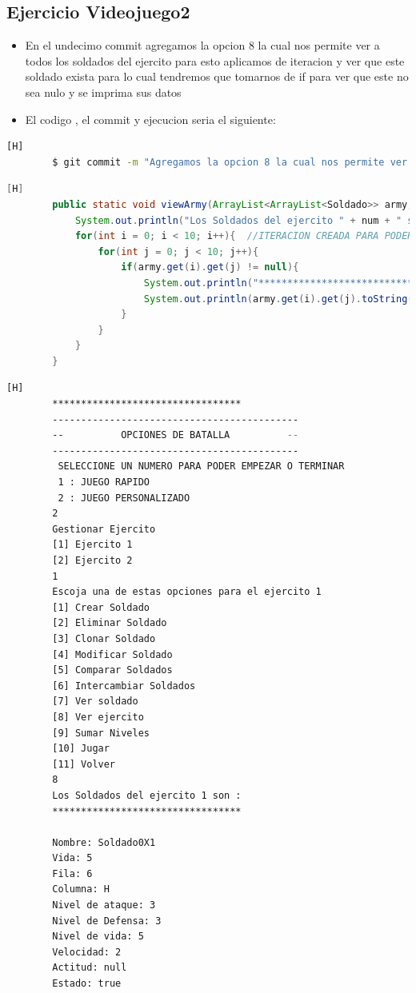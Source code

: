 \documentclass{article}
\begin{document}
	\subsection{Ejercicio Videojuego2}
	\begin{itemize}	
		\item En el undecimo commit agregamos la opcion 8 la cual nos permite ver a todos los soldados del ejercito para esto aplicamos de iteracion y ver que este soldado exista para lo cual tendremos que tomarnos de if para ver que este no sea nulo y se imprima sus datos
		\item El codigo , el commit y ejecucion seria el siguiente:
	\end{itemize}	
	\begin{lstlisting}[language=bash,caption={Commit}][H]
		$ git commit -m "Agregamos la opcion 8 la cual nos permite ver a todos los soldados del ejercito para esto aplicamos de iteracion y ver que este soldado exista para lo cual tendremos que tomarnos de if para ver que este no sea nulo y se imprima sus datos"
	\end{lstlisting}	
	\begin{lstlisting}[language=java,caption={Las lineas de codigos del metodo creado:}][H]
		public static void viewArmy(ArrayList<ArrayList<Soldado>> army, int num){
			System.out.println("Los Soldados del ejercito " + num + " son :");
			for(int i = 0; i < 10; i++){  //ITERACION CREADA PARA PODER SABER QUE SI ESTE BANDO DEL EJERCITO TIENE SOLDADOS PARA PODER JUGAR SI TIENE 10 ESTA OPCION ESTA CANCELADA
				for(int j = 0; j < 10; j++){
					if(army.get(i).get(j) != null){
						System.out.println("*********************************");
						System.out.println(army.get(i).get(j).toString());
					}
				}
			}
		}
	\end{lstlisting}
	\begin{lstlisting}[language=bash,caption={Ejecucion:}][H]
		*********************************
		-------------------------------------------
		--          OPCIONES DE BATALLA          --
		-------------------------------------------
		 SELECCIONE UN NUMERO PARA PODER EMPEZAR O TERMINAR
		 1 : JUEGO RAPIDO
		 2 : JUEGO PERSONALIZADO
		2
		Gestionar Ejercito 
		[1] Ejercito 1
		[2] Ejercito 2
		1
		Escoja una de estas opciones para el ejercito 1
		[1] Crear Soldado
		[2] Eliminar Soldado
		[3] Clonar Soldado
		[4] Modificar Soldado
		[5] Comparar Soldados
		[6] Intercambiar Soldados
		[7] Ver soldado
		[8] Ver ejercito
		[9] Sumar Niveles
		[10] Jugar
		[11] Volver
		8
		Los Soldados del ejercito 1 son :
		*********************************
		
		Nombre: Soldado0X1
		Vida: 5
		Fila: 6
		Columna: H
		Nivel de ataque: 3
		Nivel de Defensa: 3
		Nivel de vida: 5
		Velocidad: 2
		Actitud: null
		Estado: true				
		
	\end{lstlisting}
\end{document}

